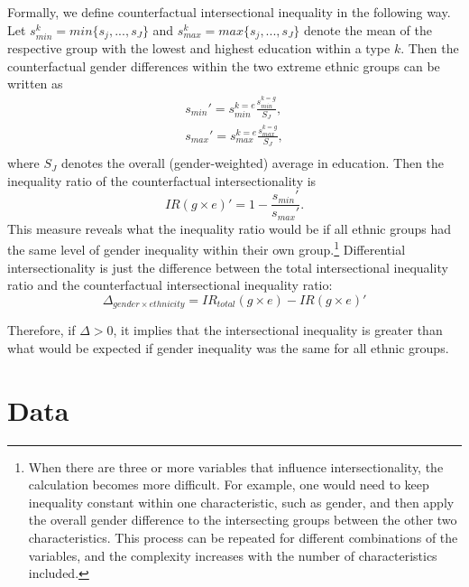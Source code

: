 Formally, we define counterfactual intersectional inequality in the following way. Let $s_{min}^k = min\{s_j, ..., s_J\}$ and $s_{max}^k = max\{s_j, ..., s_J\}$ denote the mean of the respective group with the lowest and highest education within a type $k$. Then the counterfactual gender differences within the two extreme ethnic groups can be written as 
\begin{equation}
\begin{aligned}
    s_{min}' =  s_{min}^{k=e} \frac{s_{min}^{k=g}}{S_J} ,\\
s_{max}' =  s_{max}^{k=e} \frac{s_{max}^{k=g}}{S_J} ,\\
\end{aligned}
\end{equation}
where $S_J$ denotes the overall (gender-weighted) average in education. Then the inequality ratio of the counterfactual intersectionality is 
\begin{equation}
   IR(g \times e)' = 1-\frac{s_{min}'}{s_{max}'}. 
\end{equation}
This measure reveals what the inequality ratio would be if all ethnic groups had the same level of gender inequality within their own group.\footnote{When there are three or more variables that influence intersectionality, the calculation becomes more difficult. For example, one would need to keep inequality constant within one characteristic, such as gender, and then apply the overall gender difference to the intersecting groups between the other two characteristics. This process can be repeated for different combinations of the variables, and the complexity increases with the number of characteristics included.} Differential intersectionality is just the difference between the total intersectional inequality ratio and the counterfactual intersectional inequality ratio:
\begin{equation}
    \Delta_{gender\times ethnicity} = IR_{total}(g \times e) - IR(g \times e)'
\end{equation}

Therefore, if $\Delta > 0$, it implies that the intersectional inequality is greater than what would be expected if gender inequality was the same for all ethnic groups.
 
\hypertarget{data}{%
\section{Data}\label{data}}

